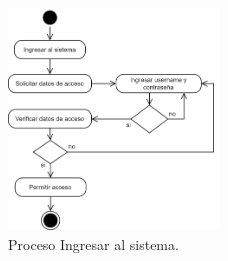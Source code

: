 	\vspace{0.3cm} %
	
	\begin{figure}[!h] %
		\caption[Diagrama de actividades - Ingresar al sistema]
		{\newline Proceso Ingresar al sistema.} %
		\centering
		\includegraphics[width=0.5\textwidth]{imagenes/cap_3/ingreso.drawio.png} %
		
		\begin{flushleft}
		\end{flushleft}
		\vspace{-16pt}
		\label{fig:DA_ingreso} %
	\end{figure}

	\vspace{0.3cm} %
	
